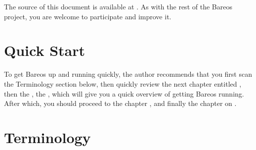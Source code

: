 The source of this document is available at . 
As with the rest of the Bareos project, you are welcome to participate and improve it.

\section{Quick Start}

To get Bareos up and running quickly, the author recommends
that you first scan the
Terminology section below, then quickly review the next chapter entitled
, then the
, 
the , which will
give you a quick overview of getting Bareos running. 
After which, you should
proceed to the chapter
, 
and finally the chapter on
.

\section{Terminology}

